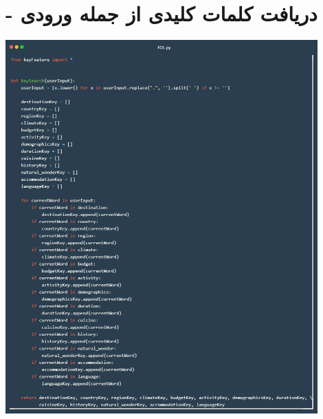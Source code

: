 \documentclass[12pt, dvipsnames, svgnames, x11names,]{article}
\begin{document}
	\section{ - دریافت کلمات کلیدی از جمله ورودی}
		\begin{center}
			\includegraphics[width=12cm]{images/05}
		\end{center}
	
\end{document}
